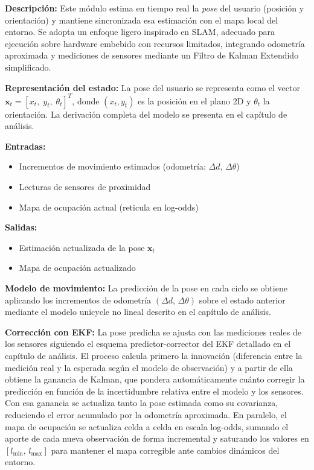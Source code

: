 \textbf{Descripción:}
Este módulo estima en tiempo real la \emph{pose} del usuario (posición y orientación) y
mantiene sincronizada esa estimación con el mapa local del entorno. Se adopta un enfoque
ligero inspirado en SLAM, adecuado para ejecución sobre hardware embebido con recursos
limitados, integrando odometría aproximada y mediciones de sensores mediante un Filtro
de Kalman Extendido simplificado.

\textbf{Representación del estado:}
La pose del usuario se representa como el vector $\mathbf{x}_t = [x_t,\; y_t,\; \theta_t]^T$,
donde $(x_t, y_t)$ es la posición en el plano 2D y $\theta_t$ la orientación.
La derivación completa del modelo se presenta en el capítulo de análisis.

\textbf{Entradas:}
\begin{itemize}
    \item Incrementos de movimiento estimados (odometría: $\Delta d$, $\Delta\theta$)
    \item Lecturas de sensores de proximidad
    \item Mapa de ocupación actual (reticula en log-odds)
\end{itemize}

\textbf{Salidas:}
\begin{itemize}
    \item Estimación actualizada de la pose $\mathbf{x}_t$
    \item Mapa de ocupación actualizado
\end{itemize}

\textbf{Modelo de movimiento:}
La predicción de la pose en cada ciclo se obtiene aplicando los incrementos de
odometría $(\Delta d,\, \Delta\theta)$ sobre el estado anterior mediante el modelo
unicycle no lineal descrito en el capítulo de análisis.

\textbf{Corrección con EKF:}
La pose predicha se ajusta con las mediciones reales de los sensores siguiendo el
esquema predictor-corrector del EKF detallado en el capítulo de análisis. El proceso
calcula primero la innovación (diferencia entre la medición real y la esperada según
el modelo de observación) y a partir de ella obtiene la ganancia de Kalman, que
pondera automáticamente cuánto corregir la predicción en función de la incertidumbre
relativa entre el modelo y los sensores. Con esa ganancia se actualiza tanto la pose
estimada como su covarianza, reduciendo el error acumulado por la odometría aproximada.
En paralelo, el mapa de ocupación se actualiza celda a celda en escala log-odds,
sumando el aporte de cada nueva observación de forma incremental y saturando los
valores en $[l_{\min},\, l_{\max}]$ para mantener el mapa corregible ante cambios
dinámicos del entorno.

